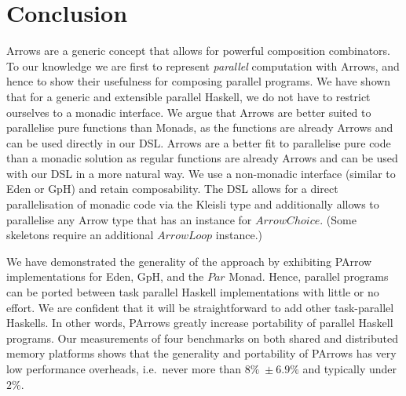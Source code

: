 \documentclass{jfp1}
\newcommand{\Conid}[1]{\mathit{#1}}
\DeclareRobustCommand{\hairspn}{\hspace{1pt}\nolinebreak}%
\DeclareRobustCommand{\ie}{{i.\hairspn{}e.~}}
\begin{document}
\section{Conclusion}
\label{sec:conclusion}
Arrows are a generic concept that allows for powerful composition
combinators. To our knowledge we are first to represent
\emph{parallel} computation with
Arrows, and hence to show their usefulness for
composing parallel
programs. We have shown that for a generic and extensible parallel Haskell, we do not have to restrict ourselves to a monadic interface. %
We argue that Arrows are better suited to  parallelise
pure functions than Monads,  as the functions are already Arrows and can be used
directly in our DSL.
Arrows are a better fit to parallelise pure code than a monadic solution as regular functions are already Arrows and can be used with our DSL in a more natural way. %
We use a non-monadic interface (similar to Eden or GpH) and retain composability.
%
The DSL allows for a direct parallelisation of monadic code via the Kleisli type and additionally allows to parallelise any Arrow type that has an instance for \ensuremath{\Conid{ArrowChoice}}. (Some skeletons require an additional \ensuremath{\Conid{ArrowLoop}} instance.)


We have demonstrated the generality of the approach by exhibiting PArrow implementations for Eden, GpH, and the \ensuremath{\Conid{Par}} Monad. Hence, parallel programs can be ported between task parallel Haskell implementations with little or no effort. We are confident that it will be straightforward to add other task-parallel Haskells.
%
In other words, PArrows greatly increase portability of parallel Haskell programs.
%
%
Our measurements of four benchmarks on both shared and distributed memory platforms shows that the generality and portability of PArrows has very low performance overheads, \ie never more than $8\% \; \pm 6.9\%$ and typically under $2\%$.
\end{document}
